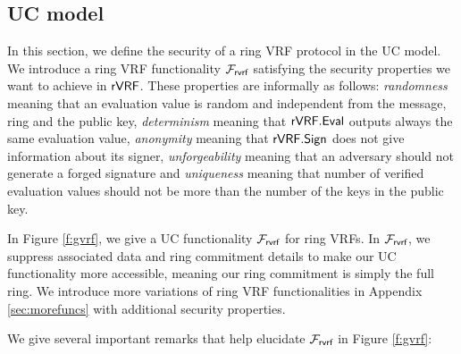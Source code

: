 
\subsection{UC model}
\label{subsec:uc_model}

In this section, we define the security of  a ring VRF protocol in the UC model. We introduce a ring VRF functionality $ \mathcal{F}_{\textsf{rvrf}} $ satisfying the security properties we want to achieve in $ {\mathsf{rVRF}} $. These properties are informally as follows: \emph{randomness} meaning that an evaluation value is random and independent from the message, ring and the public key, \emph{determinism} meaning that $ {\mathsf{rVRF}}.{\mathsf{Eval}} $ outputs always the same evaluation value, \emph{anonymity} meaning that $ {\mathsf{rVRF}}.{\mathsf{Sign}} $ does not give information about its signer, \emph{unforgeability} meaning that an adversary should not generate a forged signature and \emph{uniqueness} meaning that number of verified evaluation values should not be more than the number of the keys in the public key.

In Figure \ref{f:gvrf}, we give a UC functionality $\mathcal{F}_{\textsf{rvrf}}$ for ring VRFs.  In $\mathcal{F}_{\textsf{rvrf}}$, we suppress
associated data and ring commitment details to make our UC functionality
more accessible, meaning our ring commitment is simply the full ring. We introduce more variations of ring VRF functionalities in Appendix \ref{sec:morefuncs} with additional security properties.

We give several important remarks that help elucidate $\mathcal{F}_{\textsf{rvrf}}$ in Figure \ref{f:gvrf}:



